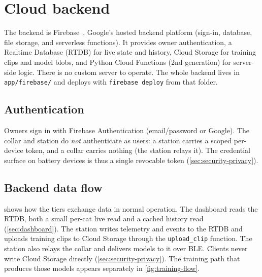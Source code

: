 \section{Cloud backend}
\label{sec:cloud-backend}

The backend is Firebase~\cite{firebase}, Google's hosted backend platform (sign-in, database, file
storage, and serverless functions). It provides owner authentication, a Realtime Database (RTDB)
for live state and history, Cloud Storage for training clips and model blobs, and Python Cloud
Functions (2nd generation) for server-side logic. There is no custom server to operate. The whole
backend lives in \texttt{app/firebase/} and deploys with \texttt{firebase deploy} from that folder.

\subsection{Authentication}

Owners sign in with Firebase Authentication (email/password or Google). The collar and station do
\emph{not} authenticate as users: a station carries a scoped per-device token, and a collar carries
nothing (the station relays it). The credential surface on battery devices is thus a single revocable
token (\cref{sec:security-privacy}).

\subsection{Backend data flow}

 shows how the tiers exchange data in normal operation. The dashboard reads the
RTDB, both a small per-cat live read and a cached history read (\cref{sec:dashboard}). The station
writes telemetry and events to the RTDB and uploads training clips to Cloud Storage through the
\texttt{upload\_clip} function. The station also relays the collar and delivers models to it over BLE.
Clients never write Cloud Storage directly (\cref{sec:security-privacy}). The training path that
produces those models appears separately in \cref{fig:training-flow}.

